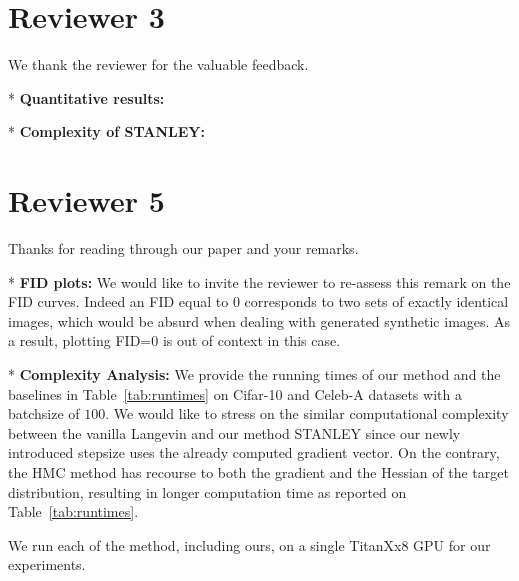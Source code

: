 \documentclass[letterpaper]{article} %
\begin{document}
\section{Reviewer 3}

We thank the reviewer for the valuable feedback.

* \textbf{Quantitative results:}

* \textbf{Complexity of STANLEY:}


\section{Reviewer 5}

Thanks for reading through our paper and your remarks. 


* \textbf{FID plots:} We would like to invite the reviewer to re-assess this remark on the FID curves. 
Indeed an FID equal to 0 corresponds to two sets of exactly identical images, which would be absurd when dealing with generated synthetic images.
As a result, plotting FID=0 is out of context in this case. 



* \textbf{Complexity Analysis:} We provide the running times of our method and the baselines in Table~\ref{tab:runtimes} on Cifar-10 and Celeb-A datasets with a batchsize of $100$.
We would like to stress on the similar computational complexity between the vanilla Langevin and our method STANLEY since our newly introduced stepsize uses the already computed gradient vector. 
On the contrary, the HMC method has recourse to both the gradient and the Hessian of the target distribution, resulting in longer computation time as reported on Table~\ref{tab:runtimes}.

\begin{table}[h]
\small
\caption{ Runtime in seconds for training our EBM during 1 epoch.}\label{tab:runtimes}
	\vspace{-0.1in}
\end{table}
We run each of the method, including ours, on a single TitanXx8 GPU for our experiments.
\end{document}
